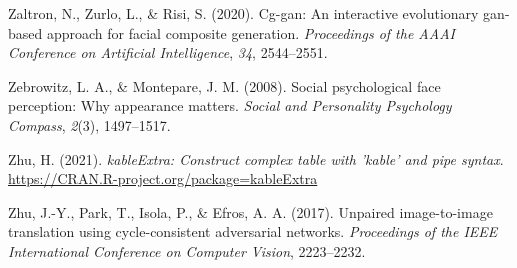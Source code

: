 \documentclass[
  doc,floatsintext]{apa6}
\newlength{\cslhangindent}
\newlength{\cslentryspacingunit} %
\newenvironment{CSLReferences}[2] %
 {%
  \setlength{\parindent}{0pt}
  \ifodd #1
  \let\oldpar\par
  \def\par{\hangindent=\cslhangindent\oldpar}
  \fi
  \setlength{\parskip}{#2\cslentryspacingunit}
 }%
 {}
\begin{document}
\begin{CSLReferences}{1}{0}
\leavevmode{}%
Zaltron, N., Zurlo, L., \& Risi, S. (2020). Cg-gan: An interactive evolutionary gan-based approach for facial composite generation. \emph{Proceedings of the AAAI Conference on Artificial Intelligence}, \emph{34}, 2544--2551.

\leavevmode{}%
Zebrowitz, L. A., \& Montepare, J. M. (2008). Social psychological face perception: Why appearance matters. \emph{Social and Personality Psychology Compass}, \emph{2}(3), 1497--1517.

\leavevmode{}%
Zhu, H. (2021). \emph{kableExtra: Construct complex table with 'kable' and pipe syntax}. \url{https://CRAN.R-project.org/package=kableExtra}

\leavevmode{}%
Zhu, J.-Y., Park, T., Isola, P., \& Efros, A. A. (2017). Unpaired image-to-image translation using cycle-consistent adversarial networks. \emph{Proceedings of the IEEE International Conference on Computer Vision}, 2223--2232.

\end{CSLReferences}

\endgroup
\end{document}
